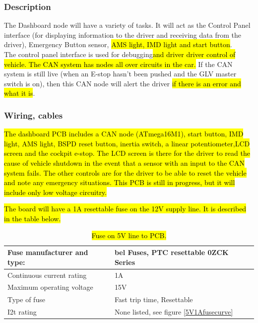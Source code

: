 \documentclass{article}
\DeclareRobustCommand{\hlr}[1]{{\sethlcolor{red}\hl{#1}}}
\begin{document}
        \subsubsection{Description}

            The Dashboard node will have a variety of tasks. It will act as the Control Panel interface (for displaying information to the driver and receiving data from the driver), Emergency Button sensor, \hlr{AMS light, IMD light and start button}.\\

            The control panel interface is used for debugging\hlr{and driver driver control of vehicle. The CAN system has nodes all over circuits in the car.} If the CAN system is still live (when an E-stop hasn't been pushed and the GLV master switch is on), then this CAN node will alert the driver \hlr{if there is an error and what it is}.\\

        \subsubsection{Wiring, cables}


            \hlr{The dashboard PCB includes a CAN node (ATmega16M1), start button, IMD light, AMS light, BSPD reset button, inertia switch, a linear potentiometer,LCD screen and the cockpit e-stop. The LCD screen is there for the driver to read the cause of vehicle shutdown in the event that a sensor with an input to the CAN system fails. The other controls are for the driver to be able to reset the vehicle and note any emergency situations. This PCB is still in progress, but it will include only low voltage circuitry.}

            \hlr{The board will have a 1A resettable fuse on the 12V supply line. It is described in the table below.}

            \begin{table}[H]
                \centering
                \begin{tabular}{|l|l|}
                    \hline
                    Fuse manufacturer and type: & bel Fuses, PTC resettable 0ZCK Series\\ \hline
                    Continuous current rating & 1A \\ \hline
                    Maximum operating voltage & 15V \\ \hline
                    Type of fuse & Fast trip time, Resettable \\ \hline
                    I2t rating & None listed, see figure \ref{5V1Afusecurve} \\ \hline
                    \end{tabular}
                \caption{\hlr{Fuse on 5V line to PCB.}}
                \label{5V1Afuse}
            \end{table}
\end{document}
